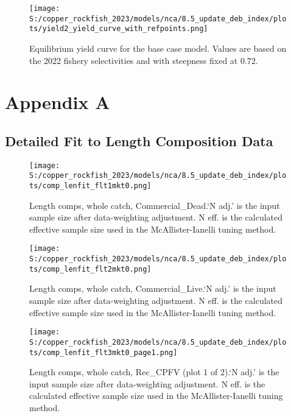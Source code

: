 \documentclass[11pt,
  english,
  letterpaper,
]{article}
\begin{document}
\begin{figure}
\centering
\texttt{[image: S:/copper\_rockfish\_2023/models/nca/8.5\_update\_deb\_index/plots/yield2\_yield\_curve\_with\_refpoints.png]}
\caption{Equilibrium yield curve for the base case model. Values are based on the 2022 fishery selectivities and with steepness fixed at 0.72.\label{fig:yield}}
\end{figure}

\hypertarget{detailed-fit-comps}{%
\section{Appendix A}\label{detailed-fit-comps}}

\hypertarget{length-data}{%
\subsection{Detailed Fit to Length Composition Data}\label{length-data}}

\begin{figure}
\centering
\texttt{[image: S:/copper\_rockfish\_2023/models/nca/8.5\_update\_deb\_index/plots/comp\_lenfit\_flt1mkt0.png]}
\caption{Length comps, whole catch, Commercial\_Dead.`N adj.' is the input sample size after data-weighting adjustment. N eff. is the calculated effective sample size used in the McAllister-Ianelli tuning method.\label{fig:comp_lenfit_flt1mkt0}}
\end{figure}

\begin{figure}
\centering
\texttt{[image: S:/copper\_rockfish\_2023/models/nca/8.5\_update\_deb\_index/plots/comp\_lenfit\_flt2mkt0.png]}
\caption{Length comps, whole catch, Commercial\_Live.`N adj.' is the input sample size after data-weighting adjustment. N eff. is the calculated effective sample size used in the McAllister-Ianelli tuning method.\label{fig:comp_lenfit_flt2mkt0}}
\end{figure}

\begin{figure}
\centering
\texttt{[image: S:/copper\_rockfish\_2023/models/nca/8.5\_update\_deb\_index/plots/comp\_lenfit\_flt3mkt0\_page1.png]}
\caption{Length comps, whole catch, Rec\_CPFV (plot 1 of 2).`N adj.' is the input sample size after data-weighting adjustment. N eff. is the calculated effective sample size used in the McAllister-Ianelli tuning method.\label{fig:comp_lenfit_flt3mkt0_page1}}
\end{figure}
\end{document}
